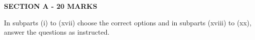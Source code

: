 \documentclass[a4paper,addpoints,12pt,answers]{exam}
\begin{document}
\hrulefill
\begin{center}
	\textbf{SECTION A - 20 MARKS}
\end{center}
\begin{questions}
	\doublespacing
	\pointsdroppedatright
	\marksnotpoints
	\setlength{\rightpointsmargin}{2.1cm}
	\pointformat{\bfseries\boldmath[\themarginpoints]}
	\question[20] In subparts (i) to (xvii) choose the correct options and in subparts (xviii) to (xx), answer the
questions as instructed. \droppoints
\end{questions}
\end{document}
